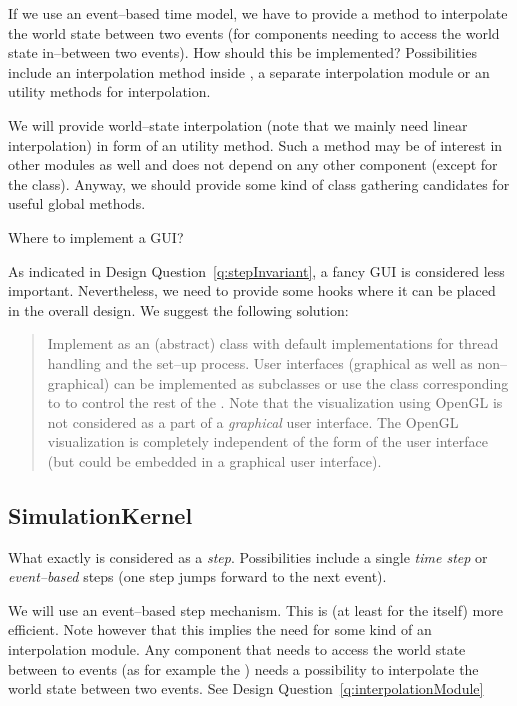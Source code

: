 \begin{appendix}
\begin{designQuestion}\label{q:interpolationModule}
If we use an event--based time model, we have to provide a method to interpolate the world state between two events (for components needing to access the world state in--between two events). How should this be implemented? Possibilities include an interpolation method inside , a separate interpolation module or an utility methods for interpolation.
\end{designQuestion}
\begin{resolution}
We will provide world--state interpolation (note that we mainly need linear interpolation) in form of an utility method. Such a method may be of interest in other modules as well and does not depend on any other component (except for the  class). Anyway, we should provide some kind of  class gathering candidates for useful global methods.
\end{resolution}

\begin{designQuestion}
Where to implement a GUI?
\end{designQuestion}
\begin{resolution}
As indicated in Design Question~\ref{q:stepInvariant}, a fancy GUI is considered less important. Nevertheless, we need to provide some hooks where it can be placed in the overall design. We suggest the following solution:
\begin{quotation}
Implement  as an (abstract) class with default implementations for thread handling and the set--up process. User interfaces (graphical as well as non--graphical) can be implemented as subclasses or use the class corresponding to  to control the rest of the \swsim. Note that the visualization using OpenGL is not considered as a part of a \emph{graphical} user interface. The OpenGL visualization is completely independent of the form of the user interface (but could be embedded in a graphical user interface).
\end{quotation}
\end{resolution}

\subsection{SimulationKernel}
\begin{designQuestion}
	What exactly is considered as a \emph{step}. Possibilities include a single \emph{time step} or \emph{event--based} steps (one step jumps forward to the next event).
	\end{designQuestion}
	\begin{resolution}
	We will use an event--based step mechanism. This is (at least for the  itself) more efficient. Note however that this implies the need for some kind of an interpolation module. Any component that needs to access the world state between to events (as for example the ) needs a possibility to interpolate the world state between two events. See Design Question~\ref{q:interpolationModule}
	\end{resolution}


\end{appendix}
